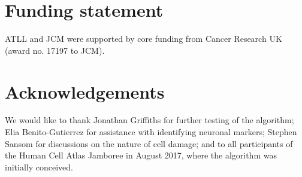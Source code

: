 \documentclass[10pt,letterpaper]{article}
\begin{document}
\section*{Funding statement}
ATLL and JCM were supported by core funding from Cancer Research UK (award no. 17197 to JCM).

\section*{Acknowledgements}
We would like to thank Jonathan Griffiths for further testing of the algorithm;
Elia Benito-Gutierrez for assistance with identifying neuronal markers;
Stephen Sansom for discussions on the nature of cell damage;
and to all participants of the Human Cell Atlas Jamboree in August 2017, where the algorithm was initially conceived.



\end{document}
